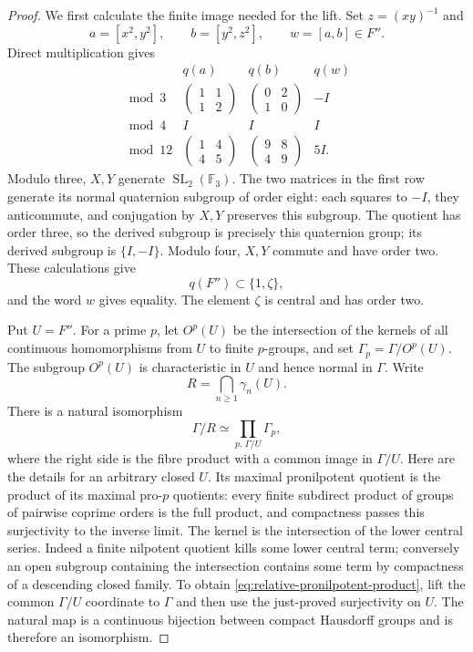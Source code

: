 \begin{proof}
We first calculate the finite image needed for the lift. Set
$z=(xy)^{-1}$ and
\[
 a=[x^2,y^2],\qquad b=[y^2,z^2],\qquad w=[a,b]\in F''.
\]
Direct multiplication gives
\[
 \begin{array}{c|c|c|c}
  &q(a)&q(b)&q(w)\\ \hline
  \bmod3&
    \begin{pmatrix}1&1\\1&2\end{pmatrix}&
    \begin{pmatrix}0&2\\1&0\end{pmatrix}&-I\\[3pt]
  \bmod4&I&I&I\\[3pt]
  \bmod12&
    \begin{pmatrix}1&4\\4&5\end{pmatrix}&
    \begin{pmatrix}9&8\\4&9\end{pmatrix}&5I.
 \end{array}
\]
Modulo three, $X,Y$ generate $\operatorname{SL}_2(\mathbb F_3)$.
The two matrices in the first row generate its normal quaternion
subgroup of order eight: each squares to $-I$, they anticommute,
and conjugation by $X,Y$ preserves this subgroup. The quotient has
order three, so the derived subgroup is precisely this quaternion
group; its derived subgroup is $\{I,-I\}$. Modulo four, $X,Y$
commute and have order two. These calculations give
\[
 q(F'')\subset\{1,\zeta\},
\]
and the word $w$ gives equality. The element $\zeta$ is central
and has order two.

Put $U=F''$. For a prime $p$, let $O^p(U)$ be the intersection of
the kernels of all continuous homomorphisms from $U$ to finite
$p$-groups, and set $\Gamma_p=\Gamma/O^p(U)$.
The subgroup $O^p(U)$ is characteristic in $U$ and hence normal in
$\Gamma$. Write
\[
 R=\bigcap_{n\geq1}\gamma_n(U).
\]
There is a natural isomorphism
\begin{equation}
 \Gamma/R\simeq
   \prod_{p,\,\Gamma/U}\Gamma_p,
 \label{eq:relative-pronilpotent-product}
\end{equation}
where the right side is the fibre product with a common image in
$\Gamma/U$. Here are the details for an arbitrary closed $U$.
Its maximal pronilpotent quotient is the product of its maximal
pro-$p$ quotients: every finite subdirect product of groups of
pairwise coprime orders is the full product, and compactness passes
this surjectivity to the inverse limit. The kernel is the
intersection of the lower central series. Indeed a finite
nilpotent quotient kills some lower central term; conversely an
open subgroup containing the intersection contains some term by
compactness of a descending closed family. To obtain
\eqref{eq:relative-pronilpotent-product}, lift the common
$\Gamma/U$ coordinate to $\Gamma$ and then use the just-proved
surjectivity on $U$. The natural map is a continuous bijection
between compact Hausdorff groups and is therefore an isomorphism.


\end{proof}
